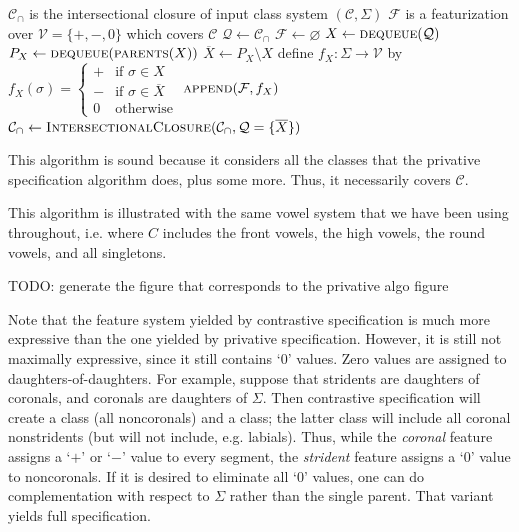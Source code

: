 \documentclass[11pt, oneside]{article}   	%
\begin{document}
\vspace{\baselineskip} \noindent \begin{algorithmic}
    \REQUIRE $\mathcal C_\cap$ is the intersectional closure of input class system $(\mathcal C, \Sigma)$
    \ENSURE $\mathcal F$ is a featurization over $\mathcal V = \{ +, -, 0 \}$ which covers $\mathcal C$
    \STATE
    \STATE $\mathcal Q \leftarrow \mathcal C_\cap$
    \STATE $\mathcal F \leftarrow \varnothing$
    \STATE
        \STATE $X \leftarrow \textsc{dequeue}(\mathcal Q)$
            \STATE $P_X \leftarrow \textsc{dequeue}(\textsc{parents}(X))$
            \STATE $\overline{X} \leftarrow P_X \setminus X$
            \STATE define $f_X : \Sigma \rightarrow \mathcal V$ by $f_X (\sigma) = \begin{cases}
                    + & \text{if } \sigma \in X \\
                    - & \text{if } \sigma \in \overline{X} \\
                    0 & \text{otherwise}
                    \end{cases}$
            \STATE $\textsc{append}(\mathcal F, f_X)$
            \STATE
            \STATE $\mathcal C_\cap \leftarrow \textsc{IntersectionalClosure}(\mathcal C_\cap, \mathcal Q = \{\overline{X}\})$
        \ENDIF
    \ENDWHILE
\end{algorithmic}

\vspace{\baselineskip} \noindent This algorithm is sound because it considers all the classes that the privative specification algorithm does, plus some more. Thus, it necessarily covers $\mathcal C$.

\vspace{\baselineskip} This algorithm is illustrated with the same vowel system that we have been using throughout, i.e. where $C$ includes the front vowels, the high vowels, the round vowels, and all singletons.

TODO: generate the figure that corresponds to the privative algo figure

\noindent Note that the feature system yielded by contrastive specification is much more expressive than the one yielded by privative specification. However, it is still not maximally expressive, since it still contains `$0$' values. Zero values are assigned to daughters-of-daughters. For example, suppose that stridents are daughters of coronals, and coronals are daughters of $\Sigma$. Then contrastive specification will create a  class (all noncoronals) and a  class; the latter class will include all coronal nonstridents (but will not include, e.g. labials). Thus, while the \textit{coronal} feature assigns a `$+$' or `$-$' value to every segment, the \textit{strident} feature assigns a `$0$' value to noncoronals. If it is desired to eliminate all `$0$' values, one can do complementation with respect to $\Sigma$ rather than the single parent. That variant yields full specification.
\end{document}
